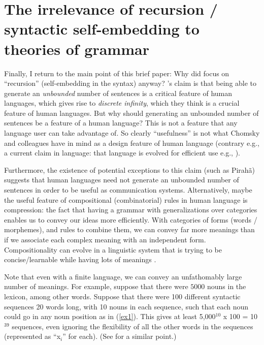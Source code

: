 \documentclass{article}
\newcommand{\exref}[1]{(\ref{#1})}
\begin{document}
\section{The irrelevance of recursion / syntactic self-embedding to theories of grammar}
\label{irrel_recursion_sec}

Finally,  I return to the main point of this brief paper: Why did \cite{hauser2002faculty} focus on ``recursion'' (self-embedding in the syntax) anyway?  \cite{hauser2002faculty}’s claim is that being able to generate an \textit{unbounded} number of sentences is a critical feature of human languages, which gives rise to \textit{discrete infinity}, which they think is a crucial feature of human languages.  But why should generating an unbounded number of sentences be a feature of a human language?  This is not a feature that any language user can take advantage of. So clearly ``usefulness'' is not what Chomsky and colleagues have in mind as a design feature of human language (contrary e.g., a current claim in language: that language is evolved for efficient use e.g., \cite{gibson2019efficiency}).

Furthermore, the existence of potential exceptions to this claim (such as Pirahã) suggests that human languages need not generate an unbounded number of sentences in order to be useful as communication systems. Alternatively, maybe the useful feature of compositional (combinatorial) rules in human language is compression: the fact that having a grammar with generalizations over categories enables us to convey our ideas more efficiently. With categories of forms (words / morphemes), and rules to combine them, we can convey far more meanings than if we associate each complex meaning with an independent form. Compositionality can evolve in a linguistic system that is trying to be concise/learnable while having lots of meanings \citep{kirby2000syntax}.


Note that even with a finite language, we can convey an unfathomably large number of meanings. For example, suppose that there were $5000$ nouns in the lexicon, among other words. Suppose that there were 100 different syntactic sequences 20 words long, with 10 nouns in each sequence, such that each noun could go in any noun position as in \exref{ex1}. This gives at least 5,000$^{10}$ x 100 = 10$^{39}$ sequences, even ignoring the flexibility of all the other words in the sequences (represented as ``x$_i$'' for each). (See \cite{muller2016grammatical} for a similar point.)
\end{document}
